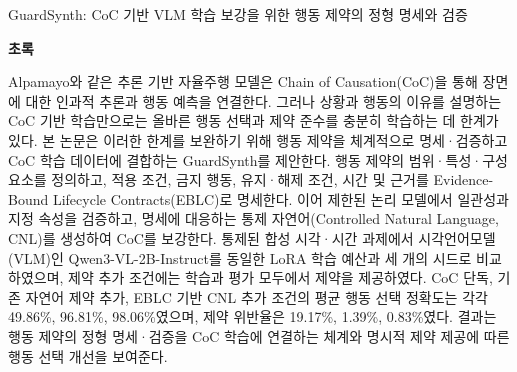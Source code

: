 \documentclass[11pt,a4paper]{article}
\begin{document}
\vspace*{8mm}
{\Large\bfseries\color{navy}\raggedright GuardSynth: CoC 기반 VLM 학습 보강을 위한 행동 제약의 정형 명세와 검증\par}
\vspace{8mm}
{\large\bfseries 초록\par}
\vspace{3mm}
Alpamayo와 같은 추론 기반 자율주행 모델은 Chain of Causation(CoC)을 통해 장면에 대한 인과적 추론과 행동 예측을 연결한다. 그러나 상황과 행동의 이유를 설명하는 CoC 기반 학습만으로는 올바른 행동 선택과 제약 준수를 충분히 학습하는 데 한계가 있다. 본 논문은 이러한 한계를 보완하기 위해 행동 제약을 체계적으로 명세·검증하고 CoC 학습 데이터에 결합하는 GuardSynth를 제안한다. 행동 제약의 범위·특성·구성 요소를 정의하고, 적용 조건, 금지 행동, 유지·해제 조건, 시간 및 근거를 Evidence-Bound Lifecycle Contracts(EBLC)로 명세한다. 이어 제한된 논리 모델에서 일관성과 지정 속성을 검증하고, 명세에 대응하는 통제 자연어(Controlled Natural Language, CNL)를 생성하여 CoC를 보강한다. 통제된 합성 시각·시간 과제에서 시각언어모델(VLM)인 Qwen3-VL-2B-Instruct를 동일한 LoRA 학습 예산과 세 개의 시드로 비교하였으며, 제약 추가 조건에는 학습과 평가 모두에서 제약을 제공하였다. CoC 단독, 기존 자연어 제약 추가, EBLC 기반 CNL 추가 조건의 평균 행동 선택 정확도는 각각 49.86\%, 96.81\%, 98.06\%였으며, 제약 위반율은 19.17\%, 1.39\%, 0.83\%였다. 결과는 행동 제약의 정형 명세·검증을 CoC 학습에 연결하는 체계와 명시적 제약 제공에 따른 행동 선택 개선을 보여준다.
\end{document}
